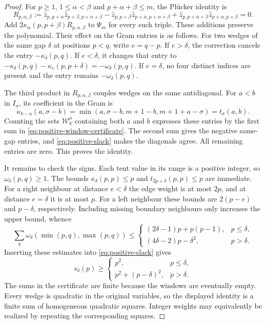 \begin{proof}

For $p\ge1$, $1\le\alpha<\beta$ and
$p+\alpha+\beta\le m$, the Pl\"ucker identity is
\[
 R_{p,\alpha,\beta}
 :=\hat z_{p,p+\alpha}\hat z_{p+\beta,p+\alpha+\beta}
  -\hat z_{p,p+\beta}\hat z_{p+\alpha,p+\alpha+\beta}
  +\hat z_{p,p+\alpha+\beta}\hat z_{p+\alpha,p+\beta}=0.
\]
Add $2\kappa_\alpha(p,p+\beta)R_{p,\alpha,\beta}$ to
$\Psi_m$ for every such triple. These additions preserve the
polynomial. Their effect on the Gram entries is as follows.
For two wedges of the same gap $\delta$ at positions $p<q$,
write $e=q-p$. If $e>\delta$, the correction cancels the entry
$-\kappa_\delta(p,q)$. If $e<\delta$, it changes that entry to
$-\kappa_\delta(p,q)-\kappa_e(p,p+\delta)=-\omega_\delta(p,q)$.
If $e=\delta$, no four distinct indices are present and the entry
remains $-\omega_\delta(p,q)$.

The third product in $R_{p,\alpha,\beta}$ couples wedges on the
same antidiagonal. For $a<b$ in $I_\sigma$, its coefficient in
the Gram is
\[
 \kappa_{b-a}(a,\sigma-b)
 =\min(a,\sigma-b,m+1-b,m+1+a-\sigma)
 =t_\sigma(a,b).
\]
Counting the sets $\mathcal W_k^\sigma$ containing both $a$ and
$b$ expresses these entries by the first sum in
\eqref{eq:positive-window-certificate}. The second sum gives
the negative same-gap entries, and \eqref{eq:positive-slack}
makes the diagonals agree. All remaining entries are zero.
This proves the identity.

It remains to check the signs. Each tent value in its range is
a positive integer, so $\omega_\delta(p,q)\ge1$.
The bounds $\kappa_\delta(p,p)\le p$ and
$t_{2p+\delta}(p,p)\le p$ are immediate.
For a right neighbour at distance $e<\delta$ the edge weight
is at most $2p$, and at distance $e=\delta$ it is at most $p$.
For a left neighbour these bounds are $2(p-e)$ and $p-\delta$,
respectively. Including missing boundary neighbours only increases
the upper bound, whence
\[
 \sum_q\omega_\delta(\min(p,q),\max(p,q))
 \le
 \begin{cases}
 (2\delta-1)p+p(p-1),&p\le\delta,\\
 (4\delta-2)p-\delta^2,&p>\delta.
 \end{cases}
\]
Inserting these estimates into \eqref{eq:positive-slack} gives
\[
 s_\delta(p)\ge
 \begin{cases}
 p^2,&p\le\delta,\\
 p^2+(p-\delta)^2,&p>\delta.
 \end{cases}
\]
The sums in the certificate are finite because the windows are
eventually empty. Every wedge is quadratic in the original variables,
so the displayed identity is a finite sum of homogeneous quadratic
squares. Integer weights may equivalently be realized by repeating
the corresponding squares.
\end{proof}

